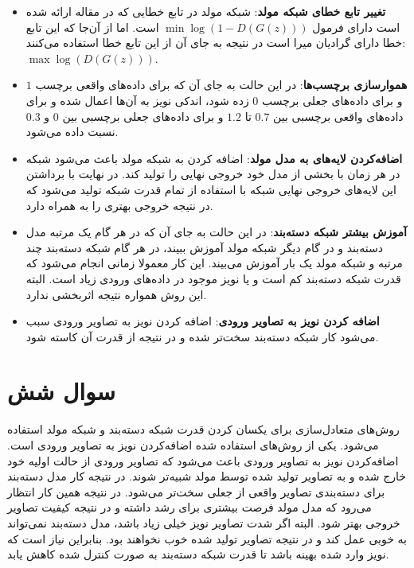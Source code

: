 \documentclass[12pt, a4paper]{book}
\begin{document}
\begin{itemize}
    \item \textbf{تغییر تابع خطای شبکه مولد}: شبکه مولد در تابع خطایی که در مقاله  ارائه
    شده است دارای فرمول $\min \log(1-D(G(z)))$ است. اما از آن‌جا که این تابع خطا دارای گرادیان
    میرا است در نتیجه به جای آن از این تابع خطا استفاده می‌کنند: $\max \log(D(G(z)))$.
    \item \textbf{هموارسازی برچسب‌ها}: در این حالت به جای آن که برای داده‌های واقعی برچسب $1$
    و برای داده‌های جعلی برچسب $0$ زده شود، اندکی نویز به آن‌ها اعمال شده و برای داده‌های واقعی برچسبی
    بین $0.7$ تا $1.2$ و برای داده‌های جعلی برچسبی بین $0$ و $0.3$ نسبت داده می‌شود.
    \item \textbf{اضافه‌کردن لایه‌های  به مدل مولد}: اضافه کردن  به شبکه مولد باعث
    می‌شود شبکه در هر زمان با بخشی از مدل خود خروجی نهایی را تولید کند. در نهایت با برداشتن این لایه‌های
     خروجی نهایی شبکه با استفاده از تمام قدرت شبکه تولید می‌شود که در نتیجه خروجی بهتری را به
    همراه دارد.
    \item \textbf{آموزش بیشتر شبکه دسته‌بند}: در این حالت به جای آن که در هر گام یک مرتبه مدل دسته‌بند
    و در گام دیگر شبکه مولد آموزش ببیند، در هر گام شبکه دسته‌بند چند مرتبه و شبکه مولد یک بار آموزش می‌بیند.
    این کار معمولا زمانی انجام می‌شود که قدرت شبکه دسته‌بند کم است و یا نویز موجود در داده‌های ورودی زیاد
    است. البته این روش همواره نتیجه اثربخشی ندارد.
    \item \textbf{اضافه کردن نویز به تصاویر ورودی}: اضافه کردن نویز به تصاویر ورودی سبب می‌شود کار شبکه
    دسته‌بند سخت‌تر شده و در نتیجه از قدرت آن کاسته شود.
\end{itemize}

\section*{سوال شش}

روش‌های متعادل‌سازی برای یکسان کردن قدرت شبکه‌ دسته‌بند و شبکه مولد استفاده می‌شود. یکی از روش‌های
استفاده شده اضافه‌کردن نویز به تصاویر ورودی است. اضافه‌کردن نویز به تصاویر ورودی باعث می‌شود که
تصاویر ورودی از حالت اولیه خود خارج شده و به تصاویر تولید شده توسط مولد شبیه‌تر شوند. در نتیجه کار مدل
دسته‌بند برای دسته‌بندی تصاویر واقعی از جعلی سخت‌تر می‌شود. در نتیجه همین کار انتظار می‌رود که مدل
مولد فرصت بیشتری برای رشد داشته و در نتیجه کیفیت تصاویر خروجی بهتر شود. البته اگر شدت تصاویر نویز
خیلی زیاد باشد، مدل ‌دسته‌بند نمی‌تواند به خوبی عمل کند و در نتیجه تصاویر تولید شده خوب نخواهند بود.
بنابراین نیاز است که نویز وارد شده بهینه باشد تا قدرت شبکه دسته‌بند به صورت کنترل شده کاهش یابد.
\end{document}
